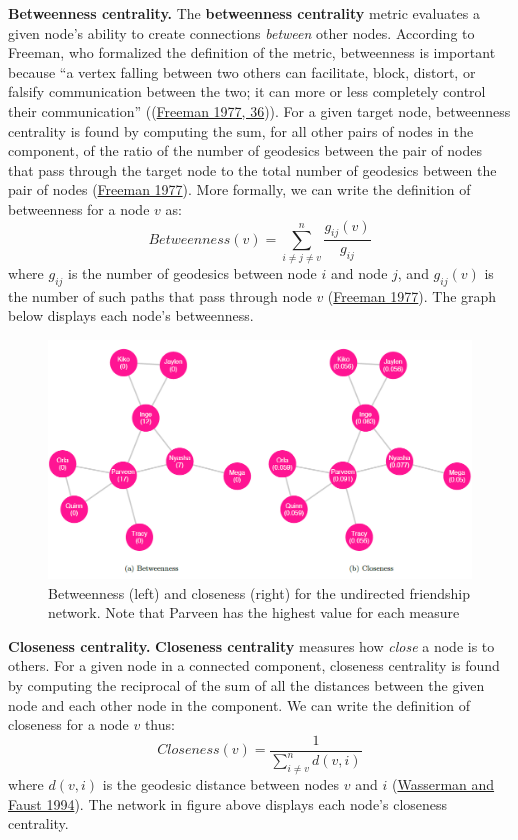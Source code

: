 \documentclass{book}
\begin{document}
\textbf{Betweenness centrality.} The \textbf{betweenness centrality} metric
evaluates a given node's ability to create connections \emph{between} other
nodes. According to Freeman, who formalized the definition of the metric,
betweenness is important because ``a vertex falling between two others can
facilitate, block, distort, or falsify communication between the two; it can
more or less completely control their communication''
((\protect\hyperlink{ref-Freeman1977}{Freeman 1977, 36})). For a given target
node, betweenness centrality is found by computing the sum, for all other
pairs of nodes in the component, of the ratio of the number of geodesics
between the pair of nodes that pass through the target node to the total
number of geodesics between the pair of nodes
(\protect\hyperlink{ref-Freeman1977}{Freeman 1977}). More formally, we can
write the definition of betweenness for a node \(v\) as:
\[Betweenness(v) = \sum_{i \neq j \neq v}^{n}\frac{g_{ij}(v)}{g_{ij}}\] where
\(g_{ij}\) is the number of geodesics between node \(i\) and node \(j\), and
\(g_{ij}(v)\) is the number of such paths that pass through node \(v\)
(\protect\hyperlink{ref-Freeman1977}{Freeman 1977}). The graph below displays
each node's betweenness.

\begin{figure}
\centering
\includegraphics{images/social-networks/11-7.png}
\caption{Betweenness (left) and closeness (right) for the undirected
friendship network. Note that Parveen has the highest value for each measure}
\end{figure}

\textbf{Closeness centrality.} \textbf{Closeness centrality} measures how
\emph{close} a node is to others. For a given node in a connected component,
closeness centrality is found by computing the reciprocal of the sum of all
the distances between the given node and each other node in the component. We
can write the definition of closeness for a node \(v\) thus:
\[Closeness(v) = \frac{1}{\sum_{i \neq v}^{n}d(v, i)}\] where \(d(v, i)\) is
the geodesic distance between nodes \(v\) and \(i\)
(\protect\hyperlink{ref-WassermanFaust1994}{Wasserman and Faust 1994}). The
network in figure above displays each node's closeness centrality.
\end{document}
